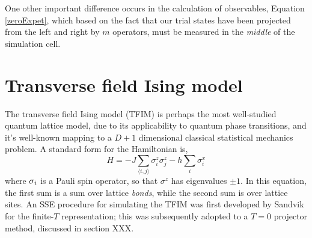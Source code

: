 \documentclass[vecphys]{svmult}
\begin{document}
One other important difference occurs in the calculation of observables, Equation \ref{zeroExpet}, which based on the fact that our trial states have been projected from the left and right by $m$ operators, must be measured in the {\em middle} of the simulation cell.

\section{Transverse field Ising model} \label{Melko:TFIMSec}

The transverse field Ising model (TFIM) is perhaps the most well-studied quantum lattice model, due to its applicability to quantum phase transitions, and it's well-known mapping to a $D+1$ dimensional classical statistical mechanics problem.  A standard form for the Hamiltonian is,
\begin{equation}
H = -J\sum_{\langle i,j \rangle} \sigma^z_i \sigma^z_j - h \sum_{i} \sigma^x_i
\end{equation}
where ${\bf \sigma}_i$ is a Pauli spin operator, so that $\sigma^z$ has eigenvalues $\pm 1$.  In this equation, the first sum is a sum over lattice {\em bonds}, while the second sum is over lattice sites.  An SSE procedure for simulating the TFIM was first developed by Sandvik for the finite-$T$ representation; this was subsequently adopted to a $T=0$ projector method, discussed in section XXX.
\end{document}
